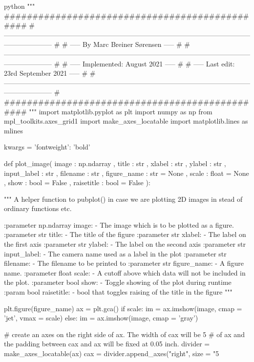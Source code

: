 \documentclass[../main.tex]{subfiles}
\begin{document}
\begin{mintedbox}{python}
"""
###############################################
# --------------------------------------------------------------------------------------------------------------------------------- #
# -----       By Marc Breiner Sørensen        ----- #
# --------------------------------------------------------------------------------------------------------------------------------- #
# ----- Implemented:           August    2021 ----- #
# ----- Last edit:      23rd   September 2021 ----- #
# --------------------------------------------------------------------------------------------------------------------------------- #
###############################################
"""
import matplotlib.pyplot as plt
import numpy as np
from mpl_toolkits.axes_grid1 import make_axes_locatable
import matplotlib.lines as mlines

kwargs  =  {'fontweight': 'bold'}


def plot_image( image           : np.ndarray    ,
title           : str           ,
xlabel          : str           ,
ylabel          : str           ,
input_label     : str           ,
filename        : str           ,
figure_name     : str    =  None  ,
scale           : float  =  None  ,
show            : bool   =  False ,
raisetitle      : bool   =  False ):

"""
A helper function to pubplot() in case we are plotting 2D images
in stead of ordinary functions etc.

:parameter np.ndarray image:
- The image which is to be plotted as a figure.
:parameter str title:
- The title of the figure
:parameter str xlabel:
- The label on the first axis
:parameter str ylabel:
- The label on the second axis
:parameter str input_label:
- The camera name used as a label in the plot
:parameter str filename:
- The filename to be printed to
:parameter str figure_name:
- A figure name.
:parameter float scale:
- A cutoff above which data will not be included in the plot.
:parameter bool show:
- Toggle showing of the plot during runtime
:param bool raisetitle:
- bool that toggles raising of the title in the figure
"""

plt.figure(figure_name)
ax  =  plt.gca()
if scale:
im  =  ax.imshow(image, cmap = 'jet', vmax  =  scale)
else:
im  =  ax.imshow(image, cmap = 'gray')

# create an axes on the right side of ax. The width of cax will be 5%
# of ax and the padding between cax and ax will be fixed at 0.05 inch.
divider  =  make_axes_locatable(ax)
cax  =  divider.append_axes("right", size = "5%


\end{mintedbox}
\end{document}
